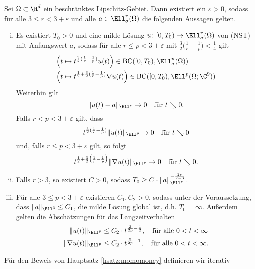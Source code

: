 \begin{hsatz}
  \label{hsatz:momomoney}
  Sei $\Omega \subset \R^d$ ein beschränktes Lipschitz-Gebiet.
  Dann existiert ein $\varepsilon > 0$, sodass für alle $3 \leq r < 3 + \varepsilon$ und alle $a \in \Ell_\sigma^r(\Omega)$ die folgenden Aussagen gelten.
  \begin{enumerate}[i)]
    \item Es existiert $T_0 > 0$ und eine milde Lösung $u \colon [0,T_0) \to \Ell_\sigma^r(\Omega)$ von (NST) mit Anfangswert $a$, sodass für alle $r \leq p < 3 + \varepsilon$ mit $\frac{3}{2} \big( \frac{1}{r} - \frac{1}{p} \big) < \frac{1}{4}$ gilt
      \begin{align*}
        &\Big( t \mapsto t^{\frac{3}{2}(\frac{1}{r} - \frac{1}{p})} u(t) \Big) \in \mathrm{BC}([0,T_0), \Ell^p_\sigma(\Omega)) \\
        &\Big( t \mapsto t^{\frac{1}{2} + \frac{3}{2}(\frac{1}{r} - \frac{1}{p})} \nabla u(t) \Big) \in \mathrm{BC}([0,T_0), \Ell^p(\Omega; \C^9) )
      \end{align*}
      Weiterhin gilt
      $$
      \|u(t) - a \|_{\Ell^r} \to 0 \quad\text{für } t \searrow 0.
      $$
      Falls $r < p < 3 + \varepsilon$ gilt, dass 
      $$
      t^{\frac{3}{2}(\frac{1}{r} - \frac{1}{p})} \|u(t)\|_{\Ell^p} \to 0 \quad\text{für } t \searrow 0
      $$
      und, falls $r \leq p < 3 + \varepsilon$ gilt, so folgt
      $$
      t^{\frac{1}{2} + \frac{3}{2}\big( \frac{1}{r} - \frac{1}{p} \big)} \|\nabla u (t) \|_{\Ell^p} \to 0 \quad\text{für } t \searrow 0.
      $$

    \item Falls $r > 3$, so existiert $C > 0$, sodass $T_0 \geq C \cdot \|a\|_{\Ell^r}^{-\frac{2r}{r - 3}}$.
    \item Für alle $3 \leq p < 3 + \varepsilon$ existieren $C_1, C_2 > 0$, sodass unter der Voraussetzung, dass $\|a\|_{\Ell^3} \leq C_1$, die milde Lösung global ist, d.h. $T_0 = \infty$.
      Außerdem gelten die Abschätzungen für das Langzeitverhalten
      \begin{align*}
        \|u(t)\|_{\Ell^p} &\leq C_2 \cdot t^{\frac{3}{2p} - \frac{1}{2}}, \quad\text{für alle } 0 < t < \infty \\
        \|\nabla u(t) \|_{\Ell^p} &\leq C_2 \cdot t^{\frac{3}{2p} - 1}, \quad\text{für alle } 0 < t < \infty.
      \end{align*}
  \end{enumerate}
\end{hsatz}
Für den Beweis von Hauptsatz \ref{hsatz:momomoney} definieren wir iterativ
